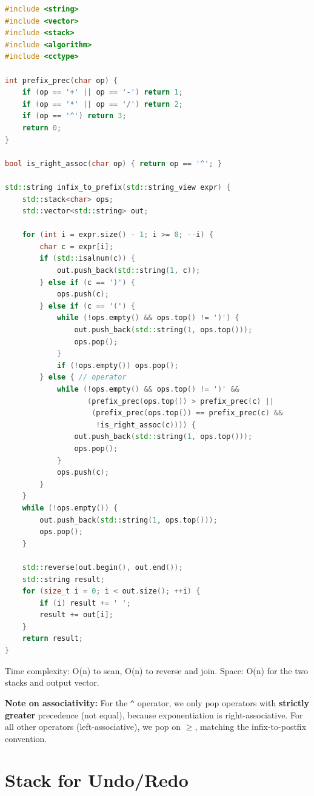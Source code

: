 \begin{lstlisting}[language=C++]
#include <string>
#include <vector>
#include <stack>
#include <algorithm>
#include <cctype>

int prefix_prec(char op) {
    if (op == '+' || op == '-') return 1;
    if (op == '*' || op == '/') return 2;
    if (op == '^') return 3;
    return 0;
}

bool is_right_assoc(char op) { return op == '^'; }

std::string infix_to_prefix(std::string_view expr) {
    std::stack<char> ops;
    std::vector<std::string> out;

    for (int i = expr.size() - 1; i >= 0; --i) {
        char c = expr[i];
        if (std::isalnum(c)) {
            out.push_back(std::string(1, c));
        } else if (c == ')') {
            ops.push(c);
        } else if (c == '(') {
            while (!ops.empty() && ops.top() != ')') {
                out.push_back(std::string(1, ops.top()));
                ops.pop();
            }
            if (!ops.empty()) ops.pop();
        } else { // operator
            while (!ops.empty() && ops.top() != ')' &&
                   (prefix_prec(ops.top()) > prefix_prec(c) ||
                    (prefix_prec(ops.top()) == prefix_prec(c) &&
                     !is_right_assoc(c)))) {
                out.push_back(std::string(1, ops.top()));
                ops.pop();
            }
            ops.push(c);
        }
    }
    while (!ops.empty()) {
        out.push_back(std::string(1, ops.top()));
        ops.pop();
    }

    std::reverse(out.begin(), out.end());
    std::string result;
    for (size_t i = 0; i < out.size(); ++i) {
        if (i) result += ' ';
        result += out[i];
    }
    return result;
}
\end{lstlisting}

Time complexity: O(n) to scan, O(n) to reverse and join. Space: O(n) for the two stacks and output vector.

\textbf{Note on associativity:} For the \texttt{\^{}} operator, we only pop operators with \textbf{strictly greater} precedence (not equal), because exponentiation is right-associative. For all other operators (left-associative), we pop on $\geq$, matching the infix-to-postfix convention.

\section{Stack for Undo/Redo}


